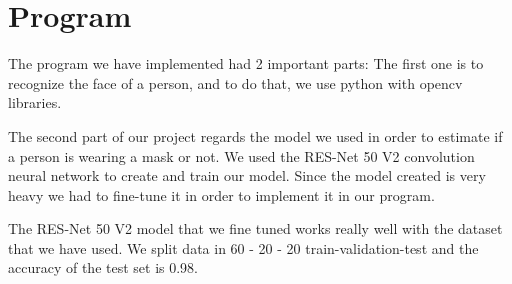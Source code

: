 \section{Program} 
The program we have implemented had 2 important parts: 
The first one is to recognize the face of a person, and to do that, we use python with opencv libraries.

The second part of our project regards the model we used in order to estimate if a person is wearing a mask or not. We used the RES-Net 50 V2 convolution neural network to create and train our model. Since the model created is very heavy we had to fine-tune it in order to implement it in our program.

The RES-Net 50 V2 model that we fine tuned works really well with the dataset that we have used. We split data in 60 - 20 - 20 train-validation-test and the accuracy of the test set is 0.98.

